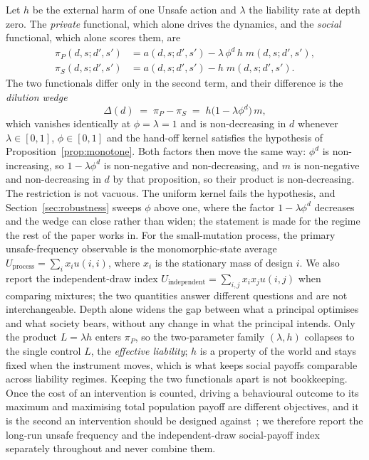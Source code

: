 \documentclass[a4paper,fleqn]{cas-sc}
\newcommand{\piP}{\pi_{P}}
\newcommand{\piS}{\pi_{S}}
\begin{document}
Let $h$ be the external harm of one Unsafe action and $\lambda$ the liability
rate at depth zero. The \emph{private} functional, which alone drives the
dynamics, and the \emph{social} functional, which alone scores them, are
\begin{align}
  \piP(d,s;d',s') &= a(d,s;d',s') - \lambda\,\phi^{d}\,h\; m(d,s;d',s'),
  \label{eq:private}\\
  \piS(d,s;d',s') &= a(d,s;d',s') - h\; m(d,s;d',s').
  \label{eq:social}
\end{align}
The two functionals differ only in the second term, and their difference is the
\emph{dilution wedge}
\begin{equation}
  \Delta(d) \;=\; \piP - \piS \;=\; h\bigl(1-\lambda\phi^{d}\bigr)\, m,
  \label{eq:wedge}
\end{equation}
which vanishes identically at $\phi=\lambda=1$ and is non-decreasing in $d$
whenever $\lambda\in[0,1]$, $\phi\in[0,1]$ and the hand-off kernel satisfies the
hypothesis of Proposition~\ref{prop:monotone}. Both factors then move the same
way: $\phi^{d}$ is non-increasing, so $1-\lambda\phi^{d}$ is non-negative and
non-decreasing, and $m$ is non-negative and non-decreasing in $d$ by that
proposition, so their product is non-decreasing. The restriction is not
vacuous. The uniform kernel fails the hypothesis, and
Section~\ref{sec:robustness} sweeps $\phi$ above one, where the factor
$1-\lambda\phi^{d}$ decreases and the wedge can close rather than widen; the
statement is made for the regime the rest of the paper works in.
For the small-mutation process, the primary unsafe-frequency observable is the
monomorphic-state average $U_{\mathrm{process}}=\sum_i x_i u(i,i)$, where $x_i$
is the stationary mass of design $i$. We also report the independent-draw index
$U_{\mathrm{independent}}=\sum_{i,j}x_i x_j u(i,j)$ when comparing mixtures;
the two quantities answer different questions and are not interchangeable.
Depth alone widens the gap between what a principal optimises
and what society bears, without any change in what the principal intends. Only
the product $L=\lambda h$ enters $\piP$, so the two-parameter family
$(\lambda,h)$ collapses to the single control $L$, the \emph{effective
liability}; $h$ is a property of the world and stays fixed when the instrument
moves, which is what keeps social payoffs comparable across liability regimes.
Keeping the two functionals apart is not bookkeeping. Once the cost of an
intervention is counted, driving a behavioural outcome to its maximum and
maximising total population payoff are different objectives, and it is the
second an intervention should be designed against~\citep{han2026welfare}; we
therefore report the long-run unsafe frequency and the independent-draw
social-payoff index separately throughout and never combine them.
\end{document}
